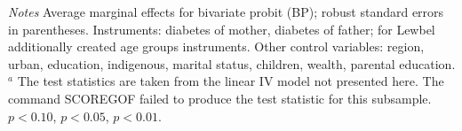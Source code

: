 \begin{table}[p]
\begin{center}
\begin{adjustbox}{max width=\textwidth, center}
\begin{threeparttable}
{\begin{tabular}{l*{4}{S S}}
\end{tabular}
\begin{tablenotes}
\item \footnotesize \textit{Notes}  Average marginal effects for bivariate probit (BP); robust standard errors in parentheses. Instruments: diabetes of mother, diabetes of father; for Lewbel additionally created age groups instruments. Other control variables: region, urban, education, indigenous, marital status, children, wealth, parental education. $^a$ The test statistics are taken from the linear IV model not presented here. The command SCOREGOF failed to produce the test statistic for this subsample.
\sym{*} \(p<0.10\), \sym{**} \(p<0.05\), \sym{***} \(p<0.01\).
\end{tablenotes}
}
\end{threeparttable}
 \end{adjustbox}
\end{center}
\end{table}


\clearpage


